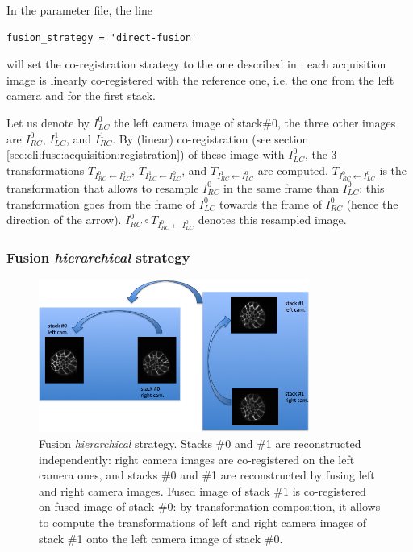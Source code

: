 In the parameter file, the line
\begin{verbatim}
fusion_strategy = 'direct-fusion'
\end{verbatim}
will set the co-registration strategy to the one described in \cite{guignard:tel-01278725,guignard:hal-01938126}: each acquisition image is linearly co-registered with the reference one, i.e. the one from the left camera and for the first stack.

Let us denote by $I^{0}_{LC}$ the left camera image of stack\#0, the three other images are $I^{0}_{RC}$, $I^{1}_{LC}$, and $I^{1}_{RC}$. By (linear) co-registration (see section \ref{sec:cli:fuse:acquisition:registration}) of these image with $I^{0}_{LC}$, the 3 transformations
$T_{I^{0}_{RC} \leftarrow I^{0}_{LC}}$,
$T_{I^{1}_{LC} \leftarrow I^{0}_{LC}}$, and
$T_{I^{1}_{RC} \leftarrow I^{0}_{LC}}$
are computed.
$T_{I^{0}_{RC} \leftarrow I^{0}_{LC}}$ is the transformation that allows to resample $I^{0}_{RC}$ in the same frame than $I^{0}_{LC}$: this transformation goes from the frame of $I^{0}_{LC}$ towards the frame of $I^{0}_{RC}$ (hence the direction of the arrow).
$I^{0}_{RC} \circ T_{I^{0}_{RC} \leftarrow I^{0}_{LC}}$ denotes this resampled image.


\subsubsection{Fusion \textit{hierarchical} strategy}

\begin{figure}
\begin{center}
\includegraphics[height=50mm]{figures/fusion-hierarchical-strategy.png}  
\end{center}
\caption{\label{fig:cli:fuse:hierarchical:strategy} Fusion \textit{hierarchical} strategy. Stacks \#0 and \#1 are reconstructed independently: right camera images are co-registered on the left camera ones, and stacks \#0 and \#1 are reconstructed by fusing left and right camera images. Fused image of stack \#1 is co-registered on fused image of stack \#0: by transformation composition, it allows to compute the transformations of left and right camera images of stack \#1 onto the left camera image of stack \#0.}
\end{figure}

